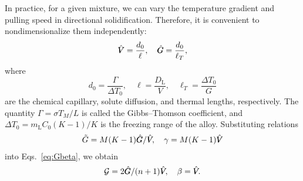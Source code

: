 \documentclass{article}
\newcommand{\liq}{\text{L}}
\newcommand{\hV}[1][\qty(\bar{V})]{\vphantom{#1}\mathrlap{\smash{\hat{V}}}V}
\newcommand{\hG}[1][\qty(\bar{G})]{\vphantom{#1}\mathrlap{\smash{\hat{G}}}G}
\begin{document}
In practice, for a given mixture, we can vary the temperature gradient and pulling speed in directional solidification.
Therefore, it is convenient to nondimensionalize them independently:
\begin{equation}\label{eq:hatGV}
    \hV = \frac{d_0}{\ell}, \quad \hG = \frac{d_0}{\ell_T},
\end{equation}
where
\begin{equation}\label{eq:lengths}
    d_0 = \frac{\Gamma}{\Delta{T}_0}, \quad
    \ell = \frac{D_\liq}{V}, \quad \ell_T = \frac{\Delta{T}_0}{G}
\end{equation}
are the chemical capillary, solute diffusion, and thermal lengths, respectively.
The quantity $\Gamma = \sigma T_M/L$ is called the Gibbs--Thomson coefficient,
and $\Delta{T}_0 = m_\liq C_0(K-1)/K$ is the freezing range of the alloy.
Substituting relations
\begin{equation}\label{eq:tildeGgamma}
    \tilde{G} = M(K-1)\hG/\hV, \quad \gamma = M(K-1)\hV
\end{equation}
into Eqs.~\eqref{eq:Gbeta}, we obtain
\begin{equation}\label{eq:Gbeta2}
    \mathcal{G} = 2\hG/(n+1)\hV, \quad \beta = \hV.
\end{equation}
\end{document}
